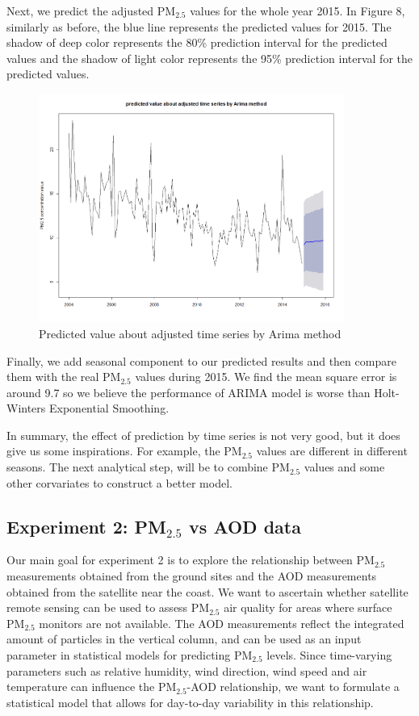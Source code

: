 \documentclass[10pt]{article}
\begin{document}
Next, we predict the adjusted PM$_{2.5}$ values for the whole year 2015. In Figure 8, similarly as before, the blue line represents the predicted values for 2015. The shadow of deep color represents the 80\% prediction interval for the predicted values and the shadow of light color represents the 95\% prediction interval for the predicted values.

\begin{figure}[H]
\centering
\includegraphics[width = 100mm]{ts6.png}
\caption{Predicted value about adjusted time series by Arima method}
\end{figure}

Finally, we add seasonal component to our predicted results and then compare
them with the real PM$_{2.5}$ values during 2015. We find the mean square error is
around 9.7 so we believe the performance of ARIMA model is worse than 
Holt-Winters Exponential Smoothing.

In summary, the effect of prediction by time series is not very good, but it
does give us some inspirations. For example, the PM$_{2.5}$ values are different in
different seasons. The next analytical step,  will be to combine PM$_{2.5}$
values and some other corvariates to construct a better model.

\subsection{Experiment 2: PM$_{2.5}$ vs AOD data}

Our main goal for experiment 2 is to explore the relationship between PM$_{2.5}$ measurements obtained from the ground sites and the AOD measurements obtained from the satellite near the coast. We want to ascertain whether satellite remote sensing can be used to assess PM$_{2.5}$ air quality for areas where surface PM$_{2.5}$  monitors are not available. The AOD measurements reflect the integrated amount of particles in the vertical column, and can be used as an input parameter in statistical models for predicting PM$_{2.5}$ levels. Since time-varying parameters such as relative humidity, wind direction, wind speed and air temperature can influence the PM$_{2.5}$-AOD relationship, we want to formulate a statistical model that allows for day-to-day variability in this relationship.  
\end{document}
